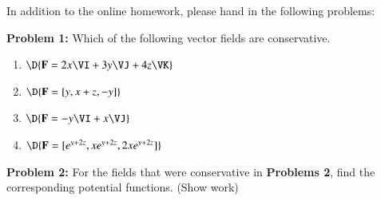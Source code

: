 \documentclass[11pt]{article}
\begin{document}


In addition to the online homework, please hand in the following problems:

\vspace{0.2cm}

%

%

%

{\bf Problem 1:} Which of the following vector fields are conservative.
\begin{enumerate}
	\item[a.] $\D{{\bf F} = 2x\VI + 3y \VJ + 4z\VK}$
	\item[b.] $\D{{\bf F} = [y,x+z,-y]}$
	\item[c.] $\D{{\bf F} = -y\VI + x \VJ}$
	\item[d.] $\D{{\bf F} = [e^{y+2z},xe^{y+2z},2xe^{y+2z}]}$
\end{enumerate}

\vspace{0.2cm}

{\bf Problem 2:} For the fields that were conservative in {\bf Problems 2}, find the corresponding potential functions.
(Show work)




%
%

		
\end{document}
